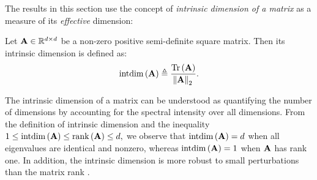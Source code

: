 {The results} in this section
use the  concept of \emph{intrinsic dimension of a matrix}\cite{tropp2015introduction,ipsen2024stable} as a measure of its {\emph{effective}} dimension: %
\begin{definition}
    Let $\mathbf{A}\in\mathbb{R}^{d\times d}$ be a non-zero positive semi-definite square matrix. Then its intrinsic dimension is defined as:
    \begin{equation*}
        \mathrm{intdim}\left(\mathbf{A}\right)\triangleq\frac{\mathrm{Tr}\left(\mathbf{A}\right)}{\norm{\mathbf{A}}_2}.
    \end{equation*}
\end{definition}
The intrinsic dimension of a matrix can be understood as quantifying the number of dimensions
{by accounting for} the spectral intensity over all dimensions. 
From 
the definition of intrinsic dimension and the inequality $1\leq \mathrm{intdim}\left(\mathbf{A}\right) \leq \mathrm{rank}\left(\mathbf{A}\right)\leq d,$
we observe that $\mathrm{intdim}\left(\mathbf{A}\right)=d$ when all %
eigenvalues are identical and nonzero, whereas $\mathrm{intdim}\left(\mathbf{A}\right)=1$ when $\mathbf{A}$ has rank one. In addition, the intrinsic dimension is more robust to small perturbations than the matrix rank \cite{ipsen2024stable}. 

